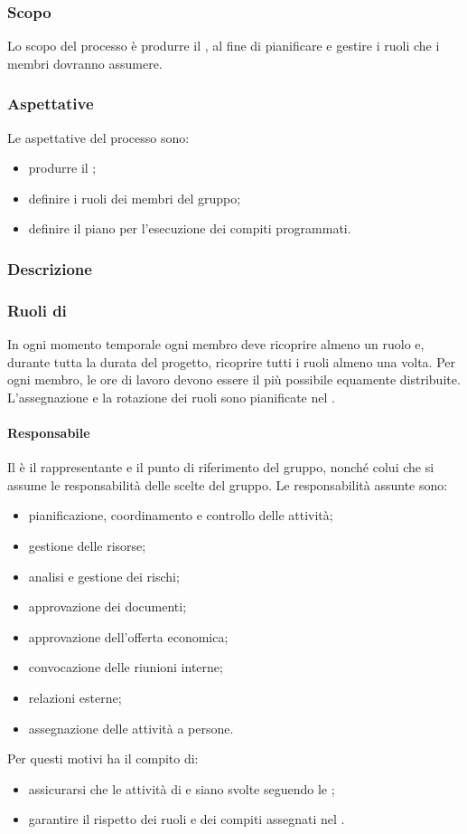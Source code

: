 \subsubsection{Scopo}
Lo scopo del processo è produrre il \PPdoc , al fine di pianificare e gestire i ruoli che i membri dovranno assumere.
\subsubsection{Aspettative}
Le aspettative del processo sono:
 \begin{itemize}
  \item produrre il \PPdoc ;
  \item definire i ruoli dei membri del gruppo;
  \item definire il piano per l'esecuzione dei compiti programmati.
 \end{itemize}
\subsubsection{Descrizione}
 
\subsubsection{Ruoli di }
 In ogni momento temporale ogni membro deve ricoprire almeno un ruolo e, durante tutta la durata del progetto, ricoprire tutti i ruoli almeno una volta. Per ogni membro, le ore di lavoro devono essere il più possibile equamente distribuite. L'assegnazione e la rotazione dei ruoli sono pianificate nel \PPdocRR.
 \paragraph{Responsabile}
 Il \RESP{} è il rappresentante e il punto di riferimento del gruppo, nonché colui che si assume le responsabilità delle scelte del gruppo.
 Le responsabilità assunte sono:
 \begin{itemize}
  \item pianificazione, coordinamento e controllo delle attività;
  \item gestione delle risorse;
  \item analisi e gestione dei rischi;
  \item approvazione dei documenti;
  \item approvazione dell'offerta economica;
  \item convocazione delle riunioni interne;
  \item relazioni esterne;
  \item assegnazione delle attività a persone.
\end{itemize}
Per questi motivi ha il compito di:
\begin{itemize}
	\item assicurarsi che le attività di  e  siano svolte seguendo le \NPdoc;
	\item garantire il rispetto dei ruoli e dei compiti assegnati nel \PPdoc.
\end{itemize}
